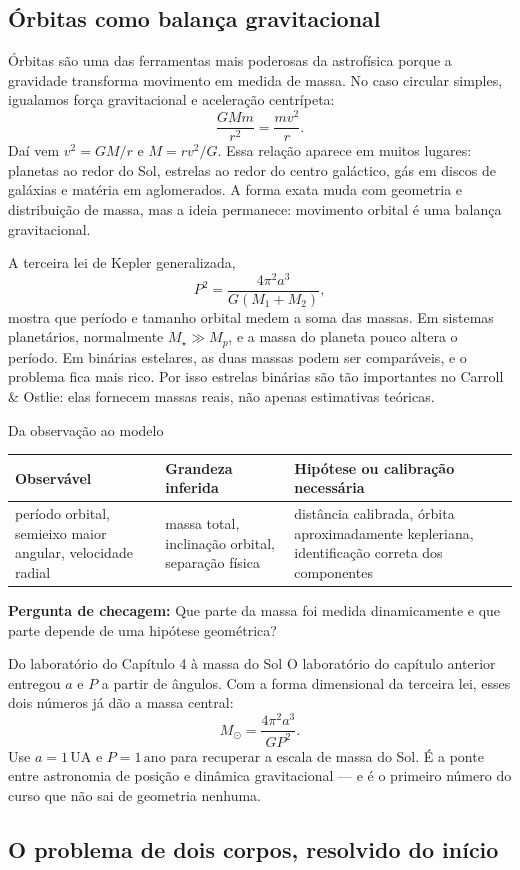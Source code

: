 \documentclass[11pt,a4paper]{article}
\newcommand{\observaveis}[4]{%
  \begin{lessonblock}[borderline west={2pt}{0pt}{astroBlue}]{Da observação ao modelo}%
  \begin{tabular}{>{\raggedright\arraybackslash}p{0.27\textwidth}>{\raggedright\arraybackslash}p{0.27\textwidth}>{\raggedright\arraybackslash}p{0.34\textwidth}}
  \toprule
  Observável & Grandeza inferida & Hipótese ou calibração necessária \\
  \midrule
  #1 & #2 & #3 \\
  \bottomrule
  \end{tabular}

  \textbf{Pergunta de checagem:} #4
  \end{lessonblock}
}
\begin{document}
\subsection*{Órbitas como balança gravitacional}

Órbitas são uma das ferramentas mais poderosas da astrofísica porque a gravidade transforma movimento em medida de massa. No caso circular simples, igualamos força gravitacional e aceleração centrípeta:
\[
\frac{GMm}{r^2}=\frac{mv^2}{r}.
\]
Daí vem $v^2=GM/r$ e $M=rv^2/G$. Essa relação aparece em muitos lugares: planetas ao redor do Sol, estrelas ao redor do centro galáctico, gás em discos de galáxias e matéria em aglomerados. A forma exata muda com geometria e distribuição de massa, mas a ideia permanece: movimento orbital é uma balança gravitacional.

A terceira lei de Kepler generalizada,
\[
P^2=\frac{4\pi^2a^3}{G(M_1+M_2)},
\]
mostra que período e tamanho orbital medem a soma das massas. Em sistemas planetários, normalmente $M_\star\gg M_p$, e a massa do planeta pouco altera o período. Em binárias estelares, as duas massas podem ser comparáveis, e o problema fica mais rico. Por isso estrelas binárias são tão importantes no Carroll \& Ostlie: elas fornecem massas reais, não apenas estimativas teóricas.

\observaveis{período orbital, semieixo maior angular, velocidade radial}{massa total, inclinação orbital, separação física}{distância calibrada, órbita aproximadamente kepleriana, identificação correta dos componentes}{Que parte da massa foi medida dinamicamente e que parte depende de uma hipótese geométrica?}

\begin{lessonblock}{Do laboratório do Capítulo 4 à massa do Sol}
O laboratório do capítulo anterior entregou $a$ e $P$ a partir de ângulos. Com a forma dimensional da terceira lei, esses dois números já dão a massa central:
\[
M_\odot=\frac{4\pi^2a^3}{GP^2}.
\]
Use $a=1\,\mathrm{UA}$ e $P=1\,\mathrm{ano}$ para recuperar a escala de massa do Sol. É a ponte entre astronomia de posição e dinâmica gravitacional --- e é o primeiro número do curso que não sai de geometria nenhuma.
\end{lessonblock}

\subsection*{O problema de dois corpos, resolvido do início}
\end{document}
